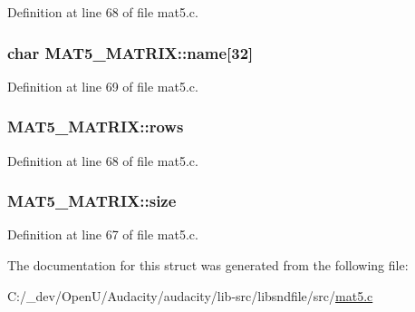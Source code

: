 Definition at line 68 of file mat5.\+c.

\subsubsection[{\texorpdfstring{name}{name}}]{\setlength{\rightskip}{0pt plus 5cm}char M\+A\+T5\+\_\+\+M\+A\+T\+R\+I\+X\+::name\mbox{[}32\mbox{]}}\hypertarget{struct_m_a_t5___m_a_t_r_i_x_acda2d7cfed0698f69d29194fb9221621}{}\label{struct_m_a_t5___m_a_t_r_i_x_acda2d7cfed0698f69d29194fb9221621}


Definition at line 69 of file mat5.\+c.

\subsubsection[{\texorpdfstring{rows}{rows}}]{ M\+A\+T5\+\_\+\+M\+A\+T\+R\+I\+X\+::rows}\hypertarget{struct_m_a_t5___m_a_t_r_i_x_ac9c07ec578a2e4ab0c8a9cc33b2ece2f}{}\label{struct_m_a_t5___m_a_t_r_i_x_ac9c07ec578a2e4ab0c8a9cc33b2ece2f}


Definition at line 68 of file mat5.\+c.

\subsubsection[{\texorpdfstring{size}{size}}]{ M\+A\+T5\+\_\+\+M\+A\+T\+R\+I\+X\+::size}\hypertarget{struct_m_a_t5___m_a_t_r_i_x_a2914ef5a45a883a0911e65846958720d}{}\label{struct_m_a_t5___m_a_t_r_i_x_a2914ef5a45a883a0911e65846958720d}


Definition at line 67 of file mat5.\+c.



The documentation for this struct was generated from the following file\+:\begin{DoxyCompactItemize}
\item 
C\+:/\+\_\+dev/\+Open\+U/\+Audacity/audacity/lib-\/src/libsndfile/src/\hyperlink{mat5_8c}{mat5.\+c}\end{DoxyCompactItemize}
